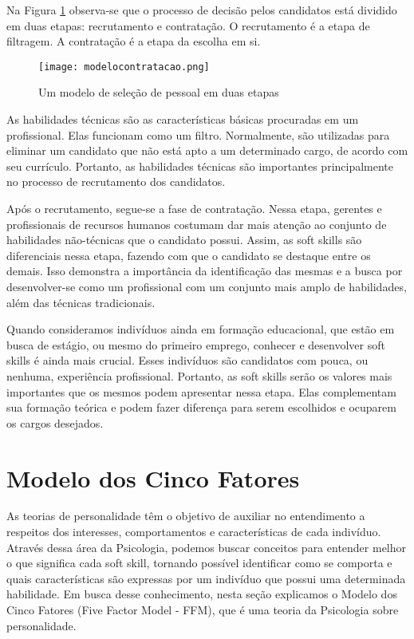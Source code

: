 Na Figura \ref{fig:modelocontratacao} observa-se que o processo de decisão pelos candidatos está dividido em duas etapas: recrutamento e contratação. O recrutamento é a etapa de filtragem. A contratação é a etapa da escolha em si.

\begin{figure}[ht]
\centering
\caption{\small Um modelo de seleção de pessoal em duas etapas}
\texttt{[image: modelocontratacao.png]}
\label{fig:modelocontratacao}
\end{figure}

As habilidades técnicas são as características básicas procuradas em um profissional. Elas funcionam como um filtro. Normalmente, são utilizadas para eliminar um candidato que não está apto a um determinado cargo, de acordo com seu currículo. Portanto, as habilidades técnicas são importantes principalmente no processo de recrutamento dos candidatos.

Após o recrutamento, segue-se a fase de contratação. Nessa etapa, gerentes e profissionais de recursos humanos costumam dar mais atenção ao conjunto de habilidades não-técnicas que o candidato possui. Assim, as soft skills são diferenciais nessa etapa, fazendo com que o candidato se destaque entre os demais. Isso demonstra a importância da identificação das mesmas e a busca por desenvolver-se como um profissional com um conjunto mais amplo de habilidades, além das técnicas tradicionais.

Quando consideramos indivíduos ainda em formação educacional, que estão em busca de estágio, ou mesmo do primeiro emprego, conhecer e desenvolver soft skills é ainda mais crucial. Esses indivíduos são candidatos com pouca, ou nenhuma, experiência profissional. Portanto, as soft skills serão os valores mais importantes que os mesmos podem apresentar nessa etapa. Elas complementam sua formação teórica e podem fazer diferença para serem escolhidos e ocuparem os cargos desejados.

\section{Modelo dos Cinco Fatores}
\label{sec:ffm}

As teorias de personalidade têm o objetivo de auxiliar no entendimento a respeitos dos interesses, comportamentos e características de cada indivíduo. Através dessa área da Psicologia, podemos buscar conceitos para entender melhor o que significa cada soft skill, tornando possível identificar como se comporta e quais características são expressas por um indivíduo que possui uma determinada habilidade. Em busca desse conhecimento, nesta seção explicamos o Modelo dos Cinco Fatores (Five Factor Model - FFM), que é uma teoria da Psicologia sobre personalidade.


